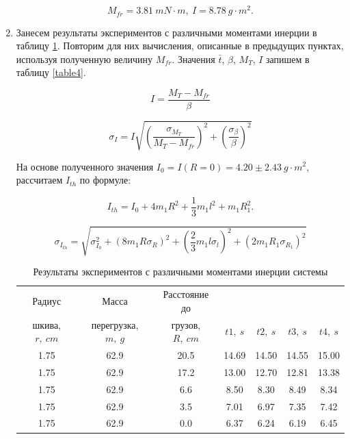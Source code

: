\documentclass[14pt, a4paper]{article}
\begin{document}
\begin{enumerate}
\[M_{fr}=3.81\ mN\cdot m,\ I=8.78\ g\cdot m^2.\]

\item Занесем результаты экспериментов с различными моментами инерции в таблицу \ref{table3}. Повторим для них вычисления, описанные в предыдущих пунктах, используя полученную величину $M_{fr}$. Значения $\bar{t}$, $\beta$, $M_T$, $I$ запишем в таблицу \ref{table4}. 

\[I=\frac{M_T-M_{fr}}{\beta}\]

\[\sigma_I=I\sqrt{\left(\frac{\sigma_{M_T}}{M_T-M_{fr}}\right)^2+\left(\frac{\sigma_{\beta}}{\beta}\right)^2}\]

На основе полученного значения $I_0=I(R=0)=4.20\pm 2.43\ g\cdot m^2$, рассчитаем $I_{th}$ по формуле:

\[I_{th}=I_0+4m_1R^2+\frac{1}{3}m_1l^2+m_1R_1^2.\]

\[\sigma_{I_{th}}=\sqrt{\sigma_{I_0}^2+\left(8m_1R\sigma_R\right)^2+\left(\frac{2}{3}m_1l\sigma_l\right)^2+\left(2m_1R_1\sigma_{R_1}\right)^2}\]

\begin{table}[!h]
\centering
\begin{tabular}{| c | c | c | c | c | c | c |}
\hline
Радиус & Масса & Расстояние до & & & & \\
шкива, $r,\ cm$ & перегрузка, $m,\ g$ & грузов, $R,\ cm$ & $t1,\ s$ & $t2,\ s$ & $t3,\ s$ & $t4,\ s$ \\
\hline
1.75 & 62.9 & 20.5 & 14.69 & 14.50 & 14.55 & 15.00 \\
\hline
1.75 & 62.9 & 17.2 & 13.00 & 12.70 & 12.81 & 13.38 \\
\hline
1.75 & 62.9 & 6.6 & 8.50 & 8.30 & 8.49 & 8.34 \\
\hline
1.75 & 62.9 & 3.5 & 7.01 & 6.97 & 7.35 & 7.42 \\
\hline
1.75 & 62.9 & 0.0 & 6.37 & 6.24 & 6.19 & 6.45 \\
\hline
\end{tabular}
\caption{Результаты экспериментов с различными моментами инерции системы}
\label{table3}
\end{table}


\end{enumerate}
\end{document}

